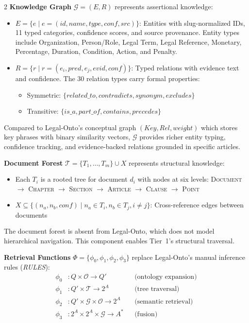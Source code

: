 \documentclass[11pt,a4paper]{article}
\begin{document}
\begin{multicols}{2}
\textbf{Knowledge Graph} $\mathcal{G} = (E, R)$ represents assertional knowledge:
\begin{itemize}
\item $E = \{e \mid e = (\textit{id}, \textit{name}, \textit{type}, \textit{conf}, \textit{src})\}$: Entities with slug-normalized IDs, 11 typed categories, confidence scores, and source provenance. Entity types include Organization, Person/Role, Legal Term, Legal Reference, Monetary, Percentage, Duration, Condition, Action, and Penalty.
\item $R = \{r \mid r = (e_i, \textit{pred}, e_j, \textit{evid}, \textit{conf})\}$: Typed relations with evidence text and confidence. The 30 relation types carry formal properties:
\begin{itemize}
\item Symmetric: $\{\textit{related\_to}, \textit{contradicts}, \textit{synonym}, \textit{excludes}\}$
\item Transitive: $\{\textit{is\_a}, \textit{part\_of}, \textit{contains}, \textit{precedes}\}$
\end{itemize}
\end{itemize}

Compared to Legal-Onto's conceptual graph $(\textit{Key}, \textit{Rel}, \textit{weight})$ which stores key phrases with binary similarity vectors, $\mathcal{G}$ provides richer entity typing, confidence tracking, and evidence-backed relations grounded in specific articles.

\textbf{Document Forest} $\mathcal{T} = \{T_1, \ldots, T_m\} \cup X$ represents structural knowledge:
\begin{itemize}
\item Each $T_i$ is a rooted tree for document $d_i$ with nodes at six levels: \textsc{Document} $\to$ \textsc{Chapter} $\to$ \textsc{Section} $\to$ \textsc{Article} $\to$ \textsc{Clause} $\to$ \textsc{Point}
\item $X \subseteq \{(n_a, n_b, \textit{conf}) \mid n_a \in T_i, n_b \in T_j, i \neq j\}$: Cross-reference edges between documents
\end{itemize}

The document forest is absent from Legal-Onto, which does not model hierarchical navigation. This component enables Tier~1's structural traversal.

\textbf{Retrieval Functions} $\Phi = \{\phi_0, \phi_1, \phi_2, \phi_3\}$ replace Legal-Onto's manual inference rules (\textit{RULES}):
\begin{equation}
\begin{aligned}
\phi_0 &: Q \times \mathcal{O} \to Q' && \text{(ontology expansion)} \\
\phi_1 &: Q' \times \mathcal{T} \to 2^A && \text{(tree traversal)} \\
\phi_2 &: Q' \times \mathcal{G} \times \mathcal{O} \to 2^A && \text{(semantic retrieval)} \\
\phi_3 &: 2^A \times 2^A \times \mathcal{G} \to A^* && \text{(fusion)}
\end{aligned}
\end{equation}


\end{multicols}
\end{document}
